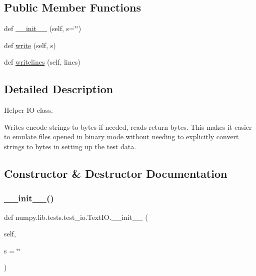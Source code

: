 \subsection*{Public Member Functions}
\begin{DoxyCompactItemize}
\item 
def \hyperlink{classnumpy_1_1lib_1_1tests_1_1test__io_1_1TextIO_a5fd1dc71952d8e2346139410486abaf5}{\+\_\+\+\_\+init\+\_\+\+\_\+} (self, s=\char`\"{}\char`\"{})
\item 
def \hyperlink{classnumpy_1_1lib_1_1tests_1_1test__io_1_1TextIO_a19f29b1433b070b2e0c63519991f450c}{write} (self, s)
\item 
def \hyperlink{classnumpy_1_1lib_1_1tests_1_1test__io_1_1TextIO_ad2fe454f318918bef4c5d2fce9d45bd6}{writelines} (self, lines)
\end{DoxyCompactItemize}


\subsection{Detailed Description}
\begin{DoxyVerb}Helper IO class.

Writes encode strings to bytes if needed, reads return bytes.
This makes it easier to emulate files opened in binary mode
without needing to explicitly convert strings to bytes in
setting up the test data.\end{DoxyVerb}
 

\subsection{Constructor \& Destructor Documentation}
\mbox{\label{classnumpy_1_1lib_1_1tests_1_1test__io_1_1TextIO_a5fd1dc71952d8e2346139410486abaf5}} 
\subsubsection{\texorpdfstring{\+\_\+\+\_\+init\+\_\+\+\_\+()}{\_\_init\_\_()}}
{\footnotesize\ttfamily def numpy.\+lib.\+tests.\+test\+\_\+io.\+Text\+I\+O.\+\_\+\+\_\+init\+\_\+\+\_\+ (\begin{DoxyParamCaption}\item[{}]{self,  }\item[{}]{s = {\ttfamily \char`\"{}\char`\"{}} }\end{DoxyParamCaption})}



